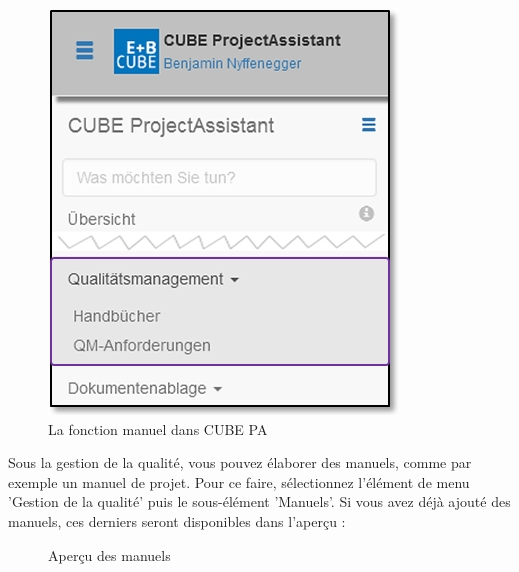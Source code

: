 \begin{figure}   %
  \vspace{-35pt}      %
  \begin{center}
    \includegraphics[width=1\linewidth]{../chapters/09_Qualitaetsmanagement/pictures/9-2_Menu_Qualitaetsmanagement_Handbuch.jpg}
  \end{center}
  \vspace{-20pt}
  \caption{La fonction manuel dans CUBE PA}
  \vspace{-10pt}
\end{figure}

Sous la gestion de la qualité, vous pouvez élaborer des manuels, comme par exemple un manuel de projet. Pour ce faire, sélectionnez l'élément de menu 'Gestion de la qualité' puis le sous-élément 'Manuels'. Si vous avez déjà ajouté des manuels, ces derniers seront disponibles dans l'aperçu :

\vspace{5cm}  

\begin{figure}[H]
\caption{Aperçu des manuels}
\end{figure}

